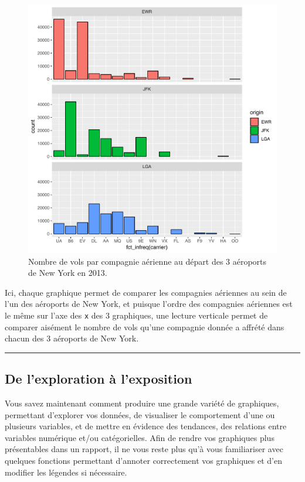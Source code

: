 \documentclass[a4paperpaper,]{article}
\theoremstyle{definition}
\theoremstyle{definition}
\theoremstyle{definition}
\theoremstyle{remark}
\begin{document}
\begin{figure}[htpb]

{\centering \includegraphics[width=0.9\linewidth]{figure/barfacet-1} 

}

\caption{Nombre de vols par compagnie aérienne au départ des 3 aéroports de New York en 2013.}\label{fig:barfacet}
\end{figure}

Ici, chaque graphique permet de comparer les compagnies aériennes au
sein de l'un des aéroports de New York, et puisque l'ordre des
compagnies aériennes est le même sur l'axe des \texttt{x} des 3
graphiques, une lecture verticale permet de comparer aisément le nombre
de vols qu'une compagnie donnée a affrété dans chacun des 3 aéroports de
New York.

\begin{center}\rule{0.5\linewidth}{\linethickness}\end{center}

\subsection{De l'exploration à
l'exposition}\label{de-lexploration-a-lexposition}

Vous savez maintenant comment produire une grande variété de graphiques,
permettant d'explorer vos données, de visualiser le comportement d'une
ou plusieurs variables, et de mettre en évidence des tendances, des
relations entre variables numérique et/ou catégorielles. Afin de rendre
vos graphiques plus présentables dans un rapport, il ne vous reste plus
qu'à vous familiariser avec quelques fonctions permettant d'annoter
correctement vos graphiques et d'en modifier les légendes si nécessaire.
\end{document}
